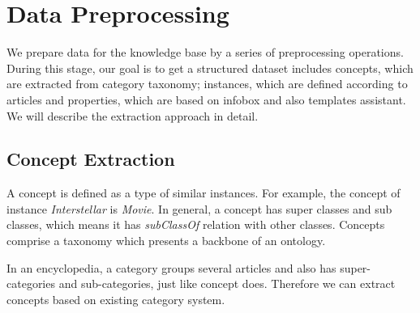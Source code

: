 \documentclass[runningheads,a4paper]{llncs}
\begin{document}
\section{Data Preprocessing}
\label{sec:dp}
We prepare data for the knowledge base by a series of preprocessing operations. During this stage, our goal is to get a structured dataset includes concepts, which are extracted from category taxonomy; instances, which are defined according to articles and properties, which are based on infobox and also templates assistant. We will describe the extraction approach in detail.

\subsection{Concept Extraction}
\label{sec:ce}
A concept is defined as a type of similar instances. For example, the concept of instance \emph{Interstellar} is \emph{Movie}. In general, a concept has super classes and sub classes, which means it has \emph{subClassOf} relation with other classes. Concepts comprise a taxonomy which presents a backbone of an ontology.

In an encyclopedia, a category groups several articles and also has super-categories and sub-categories, just like concept does. Therefore we can extract concepts based on existing category system.
\end{document}
